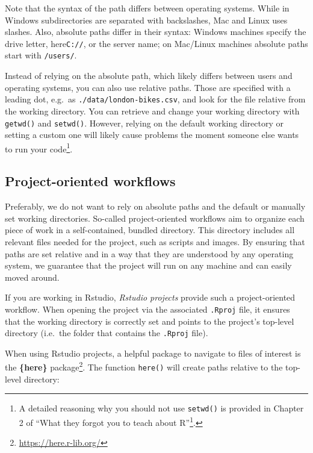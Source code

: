 \documentclass[
]{krantz}
\renewcommand{\href}[2]{#2\footnote{\url{#1}}}
\begin{document}
Note that the syntax of the path differs between operating systems. While in Windows subdirectories are separated with backslashes, Mac and Linux uses slashes. Also, absolute paths differ in their syntax: Windows machines specify the drive letter, here\texttt{C://}, or the server name; on Mac/Linux machines absolute paths start with \texttt{/users/}.

Instead of relying on the absolute path, which likely differs between users and operating systems, you can also use relative paths. Those are specified with a leading dot, e.g.~as \texttt{./data/london-bikes.csv}, and look for the file relative from the working directory. You can retrieve and change your working directory with \texttt{getwd()} and \texttt{setwd()}. However, relying on the default working directory or setting a custom one will likely cause problems the moment someone else wants to run your code\footnote{A detailed reasoning why you should not use \texttt{setwd()} is provided in \href{https://rstats.wtf/project-oriented-workflow.html}{Chapter 2 of ``What they forgot you to teach about R''}.}.

\hypertarget{workflows}{%
\subsection{Project-oriented workflows}\label{workflows}}

Preferably, we do not want to rely on absolute paths and the default or manually set working directories. So-called project-oriented workflows aim to organize each piece of work in a self-contained, bundled directory. This directory includes all relevant files needed for the project, such as scripts and images. By ensuring that paths are set relative and in a way that they are understood by any operating system, we guarantee that the project will run on any machine and can easily moved around.

If you are working in Rstudio, \emph{Rstudio projects} provide such a project-oriented workflow. When opening the project via the associated \texttt{.Rproj} file, it ensures that the working directory is correctly set and points to the project's top-level directory (i.e.~the folder that contains the \texttt{.Rproj} file).

When using Rstudio projects, a helpful package to navigate to files of interest is the \href{https://here.r-lib.org/}{\textbf{\{here\}} package}. The function \texttt{here()} will create paths relative to the top-level directory:
\end{document}
